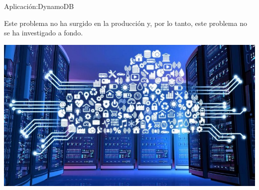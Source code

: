 \begin{frame}[fragile]{Aplicación:}{DynamoDB}
    \justifying

    Este problema no ha surgido en la producción y, por lo tanto, este problema
    no se ha investigado a fondo.

    \begin{center}
        \includegraphics[scale=0.3]{D3.jpg}
        \end{center}


\end{frame}
